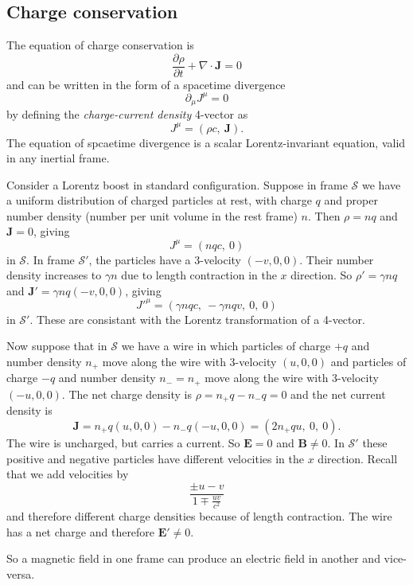 \documentclass{article}
\begin{document}
\subsection{Charge conservation}
The equation of charge conservation is
\[
	\frac{\partial \rho}{\partial t} + \nabla\cdot\mathbf J = 0
\]
and can be written in the form of a spacetime divergence
\[
	\partial_\mu J^\mu = 0
\]
by defining the \textit{charge-current density} 4-vector as
\[
  J^\mu = (\rho c, \ \mathbf J).
\]
The equation of spcaetime divergence is a scalar Lorentz-invariant equation, valid in any inertial frame.
\begin{example}
Consider a Lorentz boost in standard configuration. Suppose in frame $ \mathcal S $ we have a uniform distribution of charged particles at rest, with charge $ q $ and proper number density (number per unit volume in the rest frame) $ n $. Then $ \rho=nq $ and $ \mathbf J = 0 $, giving
\[
  J^\mu = (nqc, \ 0)
\]
in $ \mathcal S $. In frame $ \mathcal S' $, the particles have a 3-velocity $ (-v, 0,0) $. Their number density increases to $ \gamma n $ due to length contraction in the $ x $ direction. So $ \rho' = \gamma nq $ and $ \mathbf J' = \gamma nq(-v,0,0) $, giving 
\[
  J'^\mu = (\gamma nqc,\ -\gamma nqv,\ 0,\ 0)
\]
in $ \mathcal S' $. These are consistant with the Lorentz transformation of a 4-vector.
\end{example}
\begin{example}
  Now suppose that in $ \mathcal S $ we have a wire in which particles of charge $ +q $ and number density $ n_+ $ move along the wire with 3-velocity $ (u,0,0) $ and particles of charge $ -q $ and number density $ n_-=n_+ $ move along the wire with 3-velocity $ (-u,0,0) $. The net charge density is $ \rho = n_+ q - n_-q = 0 $ and the net current density is
  \[
    \mathbf J = n_+ q(u,0,0) - n_-q(-u,0,0) = (2n_+qu,\ 0,\ 0).
  \]
  The wire is uncharged, but carries a current. So $ \mathbf E = 0 $ and $ \mathbf B\ne 0 $. In $ \mathcal S' $ these positive and negative particles have different velocities in the $ x $ direction. Recall that we add velocities by
  \[
	  \frac{\pm u - v}{1\mp \frac{uv}{c^2}}
  \]
  and therefore different charge densities because of length contraction. The wire has a net charge and therefore $ \mathbf E' \ne 0 $.
\end{example}
So a magnetic field in one frame can produce an electric field in another and vice-versa.
\end{document}
